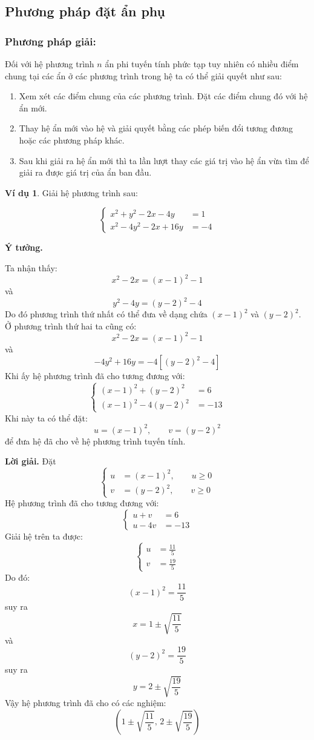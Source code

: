 \documentclass[12pt,a4paper,oneside]{book}
\theoremstyle{theorem}
\theoremstyle{definition}
\newtheorem{vd}[theorem2]{Ví dụ}
\begin{document}
     \subsection{Phương pháp đặt ẩn phụ}
        \subsubsection{Phương pháp giải:}
        Đối với hệ phương trình $n$ ẩn phi tuyến tính phức tạp tuy nhiên có nhiều điểm chung tại các ẩn ở các phương trình trong hệ ta có thể giải quyết như sau:
        \begin{enumerate}
            \item Xem xét các điểm chung của các phương trình. Đặt các điểm chung đó với hệ ẩn mới.
            \item Thay hệ ẩn mới vào hệ và giải quyết bằng các phép biến đổi tương đương hoặc các phương pháp khác.
            \item Sau khi giải ra hệ ẩn mới thì ta lần lượt thay các giá trị vào hệ ẩn vừa tìm để giải ra được giá trị của ẩn ban đầu.
        \end{enumerate}
  
  \begin{vd}Giải hệ phương trình sau:

\[
\left\{
\begin{aligned}
x^2+y^2-2x-4y &= 1\\
x^2-4y^2-2x+16y &= -4
\end{aligned}
\right.
\]

\textbf{Ý tưởng.} 

Ta nhận thấy:
\[x^2-2x=(x-1)^2-1\]
và
\[y^2-4y=(y-2)^2-4
\]
Do đó phương trình thứ nhất có thể đưa về dạng chứa
\((x-1)^2\) và \((y-2)^2\).
Ở phương trình thứ hai ta cũng có:
\[x^2-2x=(x-1)^2-1
\]
và\[-4y^2+16y=-4[(y-2)^2-4]
\]
Khi ấy hệ phương trình đã cho tương đương với:
\[
\left\{
\begin{aligned}
(x-1)^2+(y-2)^2 &= 6\\
(x-1)^2-4(y-2)^2 &= -13
\end{aligned}
\right.
\]
Khi này ta có thể đặt:
\[u=(x-1)^2,\qquad v=(y-2)^2
\]
để đưa hệ đã cho về hệ phương trình tuyến tính.

\textbf{Lời giải.}
Đặt
\[
\left\{
\begin{aligned}
u&=(x-1)^2,\qquad u\ge0\\
v&=(y-2)^2,\qquad v\ge0
\end{aligned}
\right.
\]
Hệ phương trình đã cho tương đương với:
\[
\left\{
\begin{aligned}
u+v &= 6\\
u-4v &= -13
\end{aligned}
\right.
\]
Giải hệ trên ta được:
\[
\left\{
\begin{aligned}
u&=\frac{11}{5}\\
v&=\frac{19}{5}
\end{aligned}
\right.
\]
Do đó:
\[(x-1)^2=\frac{11}{5}
\]
suy ra
\[x=1\pm\sqrt{\frac{11}{5}}
\]
và
\[(y-2)^2=\frac{19}{5}
\]
suy ra
\[y=2\pm\sqrt{\frac{19}{5}}
\]
Vậy hệ phương trình đã cho có các nghiệm:
\[
\boxed{
\left(1\pm\sqrt{\frac{11}{5}},\,
2\pm\sqrt{\frac{19}{5}}\right)
}
\]
  \end{vd}
\end{document}
